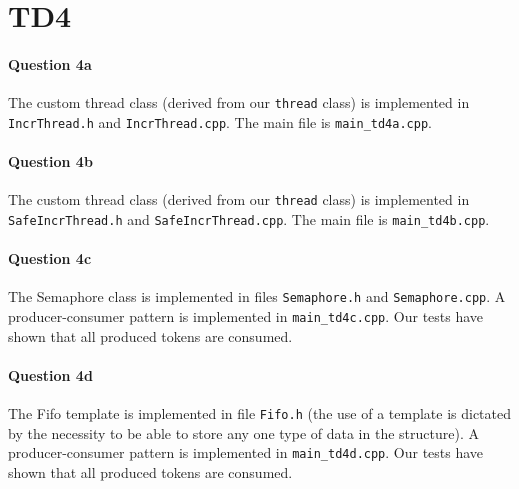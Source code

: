 \documentclass[a4paper,oneside,11pt]{article}
\begin{document}
\section*{TD4}
\paragraph{Question 4a} The custom thread class (derived from our \texttt{thread} class) is implemented in \texttt{IncrThread.h} and \texttt{IncrThread.cpp}. The main file is \texttt{main\_td4a.cpp}.

\paragraph{Question 4b} The custom thread class (derived from our \texttt{thread} class) is implemented in \texttt{SafeIncrThread.h} and \texttt{SafeIncrThread.cpp}. The main file is \texttt{main\_td4b.cpp}.

\paragraph{Question 4c} The Semaphore class is implemented in files \texttt{Semaphore.h} and \texttt{Semaphore.cpp}. A producer-consumer pattern is implemented in \texttt{main\_td4c.cpp}. Our tests have shown that all produced tokens are consumed.

\paragraph{Question 4d} The Fifo template is implemented in file \texttt{Fifo.h} (the use of a template is dictated by the necessity to be able to store any one type of data in the structure). A producer-consumer pattern is implemented in \texttt{main\_td4d.cpp}. Our tests have shown that all produced tokens are consumed.
\end{document}
